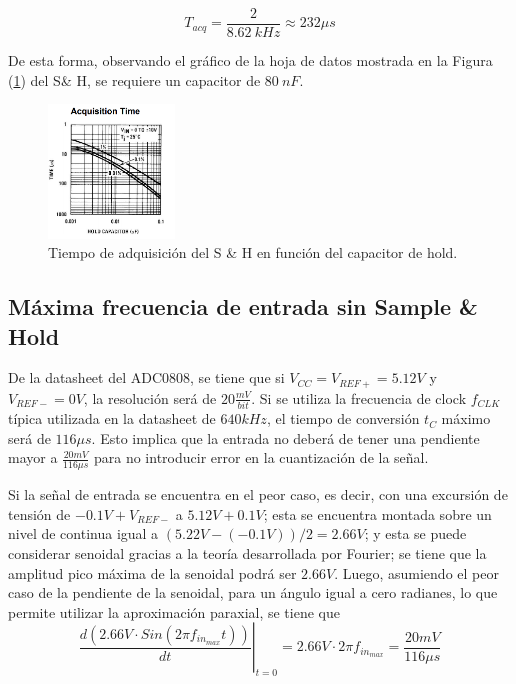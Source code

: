 \begin{equation*}
	T_{acq} = \frac{2}{8.62 \ kHz} \approx 232 \mu s
\end{equation*}

De esta forma, observando el gráfico de la hoja de datos mostrada en la Figura (\ref{chacqtime}) del S\& H, se requiere un capacitor de $80 \ nF$.

\begin{figure}[H]
	\centering
	\includegraphics[width=0.3\textwidth]{ImagenesEjercicio1/chacqtime.png}
\caption{Tiempo de adquisición del S \& H en función del capacitor de hold.}
	\label{chacqtime}
\end{figure}

\subsection{Máxima frecuencia de entrada sin Sample \& Hold}

De la datasheet del ADC0808, se tiene que si $V_{CC} = V_{REF+} = 5.12V$ y $V_{REF-} = 0V$, la resolución será de $20 \frac{mV}{bit}$. Si se utiliza la frecuencia de clock $f_{CLK}$ típica utilizada en la datasheet de $640kHz$, el tiempo de conversión $t_C$ máximo será de $116\mu s$. Esto implica que la entrada no deberá de tener una pendiente mayor a $\frac{20mV}{116\mu s}$ para no introducir error en la cuantización de la señal.


Si la señal de entrada se encuentra en el peor caso, es decir, con una excursión de tensión de $-0.1V + V_{REF-}$ a $5.12V + 0.1V$; esta se encuentra montada sobre un nivel de continua igual a $(5.22V - (-0.1V))/2 = 2.66V$; y esta se puede considerar senoidal gracias a la teoría desarrollada por Fourier; se tiene que la amplitud pico máxima de la senoidal podrá ser $2.66V$. Luego, asumiendo el peor caso de la pendiente de la senoidal, para un ángulo igual a cero radianes, lo que permite utilizar la aproximación paraxial, se tiene que
\\

\begin{equation}
\left. \frac{d \left( 2.66V \cdot Sin \left( 2\pi f_{in_{max}} t \right) \right)}{dt} \right|_{t=0} = 2.66V \cdot 2\pi f_{in_{max}} = \frac{20mV}{116\mu s}
\end{equation}
\\


